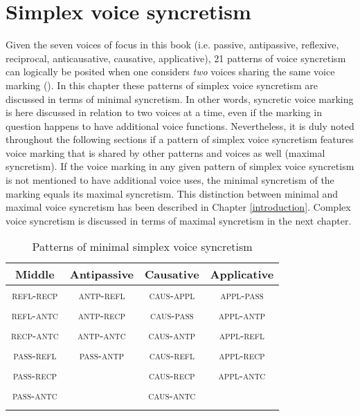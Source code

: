 \chapter{Simplex voice syncretism} \label{simpl-syncr}
Given the seven voices of focus in this book (i.e. passive, antipassive, reflexive, reciprocal, anticausative, causative, applicative), 21 patterns of voice syncretism can logically be posited when one considers \textit{two} voices sharing the same voice marking (). In this chapter these patterns of simplex voice syncretism are discussed in terms of minimal syncretism. In other words, syncretic voice marking is here discussed in relation to two voices at a time, even if the marking in question happens to have additional voice functions. Nevertheless, it is duly noted throughout the following sections if a pattern of simplex voice syncretism features voice marking that is shared by other patterns and voices as well (maximal syncretism). If the voice marking in any given pattern of simplex voice syncretism is not mentioned to have additional voice uses, the minimal syncretism of the marking equals its maximal syncretism. This distinction between minimal and maximal voice syncretism has been described in Chapter \ref{introduction}. Complex voice syncretism is discussed in terms of maximal syncretism in the next chapter.  

\begin{table}
	\begin{tabularx}{.70\textwidth}{cccc}
		\lsptoprule
		Middle & Antipassive & Causative & Applicative \\
		\midrule
		\textsc{refl-recp} & \textsc{antp-refl} & \textsc{caus-appl} & \textsc{appl-pass} \\
		\textsc{refl-antc} & \textsc{antp-recp} & \textsc{caus-pass} & \textsc{appl-antp} \\
		\textsc{recp-antc} & \textsc{antp-antc} & \textsc{caus-antp} & \textsc{appl-refl} \\
		\textsc{pass-refl} & \textsc{pass-antp} & \textsc{caus-refl} & \textsc{appl-recp} \\
		\textsc{pass-recp} & & \textsc{caus-recp} & \textsc{appl-antc} \\
		\textsc{pass-antc} & & \textsc{caus-antc} & \\
		\lspbottomrule
	\end{tabularx}
	\caption{Patterns of minimal simplex voice syncretism}
	\label{tab:ch4:simplex-patterns}
\end{table} 

